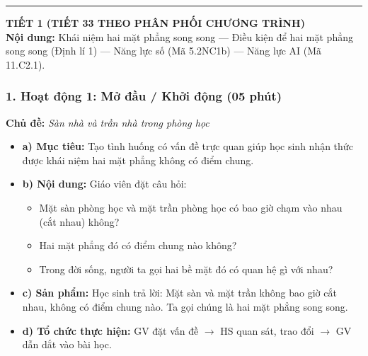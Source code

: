 \documentclass[12pt, a4paper]{article}
\begin{document}
\begin{center}
\end{center}

\vspace{0.8em}
\hrule
\vspace{0.8em}

{\large \textbf{TIẾT 1 (TIẾT 33 THEO PHÂN PHỐI CHƯƠNG TRÌNH)}}\\[0.3em]
\textbf{Nội dung:} Khái niệm hai mặt phẳng song song --- Điều kiện để hai mặt phẳng song song (Định lí 1) --- Năng lực số (Mã 5.2NC1b) --- Năng lực AI (Mã 11.C2.1).

\subsubsection*{1. Hoạt động 1: Mở đầu / Khởi động (05 phút)}
\textbf{Chủ đề:} \textit{Sàn nhà và trần nhà trong phòng học}
\begin{itemize}
    \item \textbf{a) Mục tiêu:} Tạo tình huống có vấn đề trực quan giúp học sinh nhận thức được khái niệm hai mặt phẳng không có điểm chung.
    \item \textbf{b) Nội dung:} Giáo viên đặt câu hỏi:
    \begin{itemize}
        \item Mặt sàn phòng học và mặt trần phòng học có bao giờ chạm vào nhau (cắt nhau) không?
        \item Hai mặt phẳng đó có điểm chung nào không?
        \item Trong đời sống, người ta gọi hai bề mặt đó có quan hệ gì với nhau?
    \end{itemize}
    \item \textbf{c) Sản phẩm:} Học sinh trả lời: Mặt sàn và mặt trần không bao giờ cắt nhau, không có điểm chung nào. Ta gọi chúng là hai mặt phẳng song song.
    \item \textbf{d) Tổ chức thực hiện:} GV đặt vấn đề $\to$ HS quan sát, trao đổi $\to$ GV dẫn dắt vào bài học.
\end{itemize}
\end{document}
